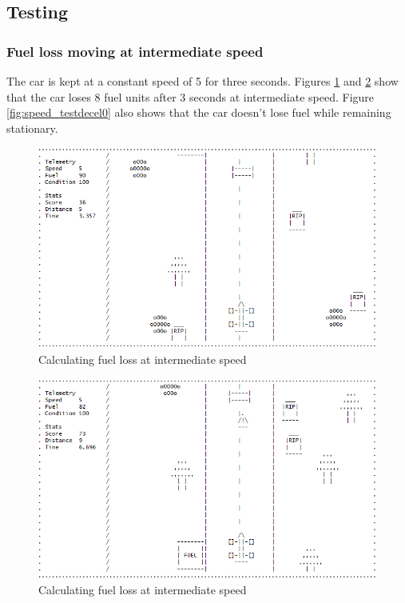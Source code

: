 \documentclass{article}
\begin{document}
\newpage
\subsection*{Testing}
\subsubsection*{Fuel loss moving at intermediate speed}
The car is kept at a constant speed of 5 for three seconds. Figures \ref{fig:fuel_test_lossmidspeed} and \ref{fig:fuel_test_lossmidspeed2} show that the car loses 8 fuel units after 3 seconds at intermediate speed. Figure \ref{fig:speed_testdecel0} also shows that the car doesn't lose fuel while remaining stationary.
\begin{figure}[!ht]
	\begin{center}
	\includegraphics[width=0.63\paperwidth]{images/fuel_test_lossmidspeed}
	\caption{Calculating fuel loss at intermediate speed}
	\label{fig:fuel_test_lossmidspeed} 
	\end{center}
\end{figure}
\begin{figure}[!ht]
	\begin{center}
	\includegraphics[width=0.63\paperwidth]{images/fuel_test_lossmidspeed2}
	\caption{Calculating fuel loss at intermediate speed}
	\label{fig:fuel_test_lossmidspeed2} 
	\end{center}
\end{figure}
\newpage
\end{document}
